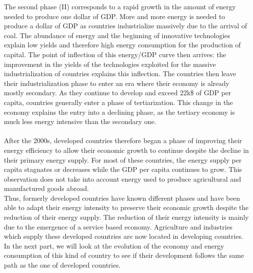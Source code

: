 \documentclass[conference]{IEEEtran}
\begin{document}
The second phase (II) corresponds to a rapid growth in the amount of energy needed to produce one dollar of GDP. More and more energy is needed to produce a dollar of GDP as countries industrialize massively due to the arrival of coal. The abundance of energy and the beginning of innovative technologies explain low yields and therefore high energy consumption for the production of capital. 
The point of inflection of this energy/GDP curve then arrives: the improvement in the yields of the technologies exploited for the massive industrialization of countries explains this inflection. The countries then leave their industrialization phase to enter an era where their economy is already mostly secondary. 
As they continue to develop and exceed 22k\$ of GDP per capita, countries generally enter a phase of tertiarization. This change in the economy explains the entry into a declining phase, as the tertiary economy is much less energy intensive than the secondary one. 
\\
\\
After the 2000s, developed countries therefore began a phase of improving their energy efficiency to allow their economic growth to continue despite the decline in their primary energy supply. For most of these countries, the energy supply per capita stagnates or decreases while the GDP per capita continues to grow. This observation does not take into account energy used to produce agricultural and manufactured goods abroad.
\\
Thus, formerly developed countries have known different phases and have been able to adapt their energy intensity to preserve their economic growth despite the reduction of their energy supply. The reduction of their energy intensity is mainly due to the emergence of a service based economy. Agriculture and industries which supply these developed countries are now located in developing countries. 
\\
In the next part, we will look at the evolution of the economy and energy consumption of this kind of country to see if their development follows the same path as the one of developed countries. 
\end{document}
